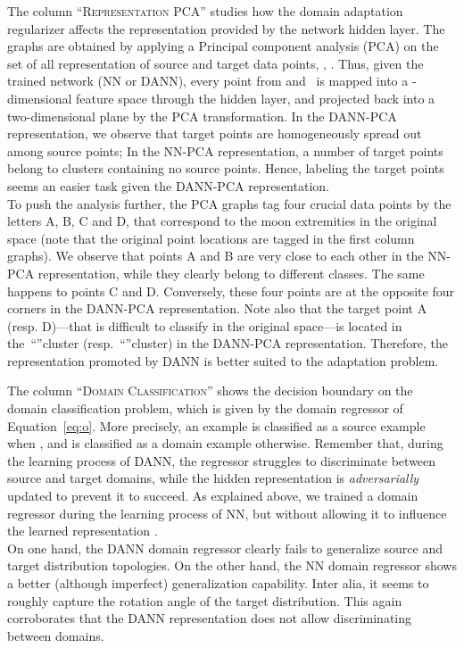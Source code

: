 \documentclass[twoside,11pt]{article}
\newcommand{\redplus}{``\red{}''}
\newcommand{\greenminus}{``\green{}''}
\begin{document}
The column ``\textsc{Representation PCA}'' 
studies how the domain adaptation regularizer affects the representation  provided by the network hidden layer. The graphs are obtained by applying a Principal component analysis (PCA) on the set of all representation of source and target data points, \ie, . Thus, given the trained network (NN or DANN), every point from  and~ is mapped into a -dimensional feature space through the hidden layer, and projected back into a two-dimensional plane by the PCA transformation. 
In the DANN-PCA representation, we observe that target points are homogeneously spread out among source points; In the NN-PCA representation, a number of target points belong to clusters containing no source points. Hence, labeling the target points seems an easier task given the DANN-PCA representation.\\
To push the analysis further, the PCA graphs tag four crucial data points by the letters A, B, C and D, that correspond to the moon extremities in the original space (note that the original point locations are tagged in the first column graphs). We observe that points A and B are very close to each other in the NN-PCA representation, while they clearly belong to different classes. The same happens to points C and D. Conversely, these four points are at the opposite four corners in the DANN-PCA representation. Note also that the target point A (resp. D)---that is difficult to classify in the original space---is located in the~\redplus cluster (resp.~\greenminus cluster) in the DANN-PCA representation.
Therefore, the representation promoted by DANN is better suited to the adaptation problem.
\smallskip

The column ``\textsc{Domain Classification}'' 
shows the decision boundary on the domain classification problem, which is given by  the  domain regressor  of Equation~\eqref{eq:o}. More precisely, an example  is classified as a source example when , and is classified as a domain example otherwise. Remember that, during the learning process of DANN, the  regressor struggles to discriminate between source and target domains, while the hidden representation  is \emph{adversarially} updated to prevent it to succeed. As explained above, we trained a domain regressor during the learning process of NN, but without allowing it to influence the learned representation .\\
On one hand, the DANN domain regressor clearly fails to generalize source and target distribution topologies. On the other hand, the NN domain regressor shows a better (although imperfect) generalization capability. Inter alia, it seems to roughly capture the rotation angle of the target distribution.  This again corroborates that the DANN representation does not allow discriminating between domains.
\smallskip
\end{document}
